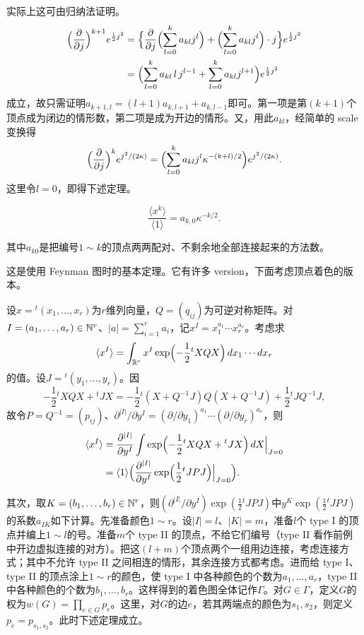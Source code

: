 实际上这可由归纳法证明。
\[
\begin{aligned}
\Bigl(\frac{\partial}{\partial j}\Bigr)^{k+1}e^{\frac12 j^2}
&=\Bigl\{\frac{\partial}{\partial j}\Bigl(\sum_{l=0}^k a_{kl}j^l\Bigr)
+\Bigl(\sum_{l=0}^k a_{kl}j^l\Bigr)\cdot j\Bigr\}e^{\frac12 j^2}\\
&=\Bigl(\sum_{l=0}^k a_{kl}\,l\,j^{l-1}
+\sum_{l=0}^k a_{kl}j^{l+1}\Bigr)e^{\frac12 j^2}
\end{aligned}
\]
成立，故只需证明$a_{k+1,l}=(l+1)a_{k,l+1}+a_{k,l-1}$即可。第一项是第$(k+1)$个顶点成为闭边的情形数，第二项是成为开边的情形。又，用此$a_{kl}$，经简单的 scale 变换得
\[
\Bigl(\frac{\partial}{\partial j}\Bigr)^k e^{j^2/(2\kappa)}
=\Bigl(\sum_{l=0}^k a_{kl}j^l\kappa^{-(k+l)/2}\Bigr)e^{j^2/(2\kappa)}.
\]
这里令$l=0$，即得下述定理。

\begin{theorem}[Wick]
\[
\frac{\langle x^k\rangle}{\langle 1\rangle}=a_{k,0}\kappa^{-k/2}.
\]
\end{theorem}

其中$a_{k0}$是把编号$1\sim k$的顶点两两配对、不剩余地全部连接起来的方法数。

这是使用 Feynman 图时的基本定理。它有许多 version，下面考虑顶点着色的版本。

设$x={}^t(x_1,\dots,x_r)$为$r$维列向量，$Q=(q_{ij})$为可逆对称矩阵。对$I=(a_1,\dots,a_r)\in\mathbb{N}^r$、$|a|=\sum_{i=1}^r a_i$，记$x^I=x_1^{a_1}\cdots x_r^{a_r}$。考虑求
\[
\langle x^I\rangle=\int_{\mathbb{R}^r}x^I\exp\Bigl(-\frac12{}^tXQX\Bigr)\,dx_1\cdots dx_r
\]
的值。设$J={}^t(y_1,\dots,y_r)$。因
\[
-\frac12{}^tXQX+{}^tJX
=-\frac12{}^t(X+Q^{-1}J)Q(X+Q^{-1}J)+\frac12{}^tJQ^{-1}J,
\]
故令$P=Q^{-1}=(p_{ij})$、$\partial^{|I|}/\partial y^I
=(\partial/\partial y_1)^{a_1}\cdots(\partial/\partial y_r)^{a_r}$，则
\[
\begin{aligned}
\langle x^I\rangle
&=\frac{\partial^{|I|}}{\partial y^I}
\int\exp\Bigl(-\frac12{}^tXQX+{}^tJX\Bigr)\,dX\Big|_{J=0}\\
&=\langle 1\rangle
\Bigl(\frac{\partial^{|I|}}{\partial y^I}\exp\Bigl(\frac12{}^tJPJ\Bigr)\Big|_{J=0}\Bigr).
\end{aligned}
\]

其次，取$K=(b_1,\dots,b_r)\in\mathbb{N}^r$，则$(\partial^{|I|}/\partial y^I)\exp(\frac12{}^tJPJ)$中$y^K\exp(\frac12{}^tJPJ)$的系数$a_{IK}$如下计算。先准备颜色$1\sim r$。设$|I|=l$、$|K|=m$，准备$l$个 type I 的顶点并编上$1\sim l$的号。准备$m$个 type II 的顶点，不给它们编号（type II 看作前例中开边虚拟连接的对方）。把这$(l+m)$个顶点两个一组用边连接，考虑连接方式；其中不允许 type II 之间相连的情形，其余连接方式都考虑。进而给 type I、type II 的顶点涂上$1\sim r$的颜色，使 type I 中各种颜色的个数为$a_1,\dots,a_r$，type II 中各种颜色的个数为$b_1,\dots,b_r$。这样得到的着色图全体记作$\Gamma$。对$G\in\Gamma$，定义$G$的权为$w(G)=\prod_{e\in G}p_e$。这里，对$G$的边$e$，若其两端点的颜色为$s_1,s_2$，则定义$p_e=p_{s_1,s_2}$。此时下述定理成立。


